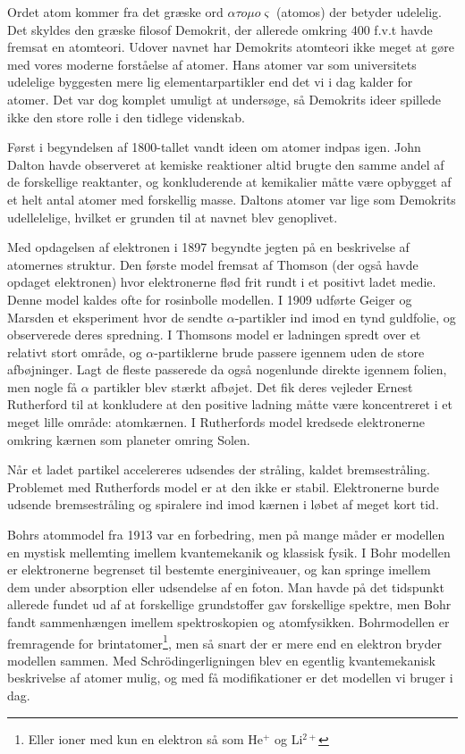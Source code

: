 \documentclass[../main.tex]{subfiles}
\begin{document}
Ordet atom kommer fra det græske ord $\alpha \tau o \mu o \varsigma$ (atomos) der betyder udelelig. Det skyldes den græske filosof Demokrit, der allerede omkring 400 f.v.t havde fremsat en atomteori. Udover navnet har Demokrits atomteori ikke meget at gøre med vores moderne forståelse af atomer. Hans atomer var som universitets udelelige byggesten mere lig elementarpartikler end det vi i dag kalder for atomer. 
Det var dog komplet umuligt at undersøge, så Demokrits ideer spillede ikke den store rolle i den tidlege videnskab.

Først i begyndelsen af 1800-tallet vandt ideen om atomer indpas igen. John Dalton havde observeret at kemiske reaktioner altid brugte den samme andel af de forskellige reaktanter, og konkluderende at kemikalier måtte være opbygget af et helt antal atomer med forskellig masse. Daltons atomer var lige som Demokrits udellelelige, hvilket er grunden til at navnet blev genoplivet. 

Med opdagelsen af elektronen i 1897 begyndte jegten på en beskrivelse af atomernes struktur. Den første model fremsat af Thomson (der også havde opdaget elektronen) hvor elektronerne flød frit rundt i et positivt ladet medie. Denne model kaldes ofte for rosinbolle modellen. 
I 1909 udførte Geiger og Marsden et eksperiment hvor de sendte $\alpha$-partikler ind imod en tynd guldfolie, og observerede deres spredning. I Thomsons model er ladningen spredt over et relativt stort område, og $\alpha$-partiklerne brude passere igennem uden de store afbøjninger. Lagt de fleste passerede da også nogenlunde direkte igennem folien, men nogle få $\alpha$ partikler blev stærkt afbøjet. Det fik deres vejleder Ernest Rutherford til at konkludere at den positive ladning måtte være koncentreret i et meget lille område: atomkærnen. I Rutherfords model kredsede elektronerne omkring kærnen som planeter omring Solen. 

Når et ladet partikel accelereres udsendes der stråling, kaldet bremsestråling. Problemet med Rutherfords model er at den ikke er stabil. Elektronerne burde udsende bremsestråling og spiralere ind imod kærnen i løbet af meget kort tid. 

Bohrs atommodel fra 1913 var en forbedring, men på mange måder er modellen en mystisk mellemting imellem kvantemekanik og klassisk fysik. I Bohr modellen er elektronerne begrenset til bestemte energiniveauer, og kan springe imellem dem under absorption eller udsendelse af en foton. Man havde på det tidspunkt allerede fundet ud af at forskellige grundstoffer gav forskellige spektre, men Bohr fandt sammenhængen imellem spektroskopien og atomfysikken.
Bohrmodellen er fremragende for brintatomer\footnote{Eller ioner med kun en elektron så som He$^+$ og Li$^{2+}$}, men så snart der er mere end en elektron bryder modellen sammen. Med Schrödingerligningen blev en egentlig kvantemekanisk beskrivelse af atomer mulig, og med få modifikationer er det modellen vi bruger i dag.
\end{document}
